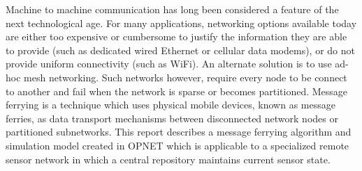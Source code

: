 Machine to machine communication has long been considered a feature of the next technological age. 
For many applications, networking options available today are either too expensive or cumbersome to justify the information they are able to provide (such as dedicated wired Ethernet or cellular data modems), or do not provide uniform connectivity (such as WiFi). 
An alternate solution is to use ad-hoc mesh networking. 
Such networks however, require every node to be connect to another and fail when the network is sparse or becomes partitioned.
Message ferrying is a technique which uses physical mobile devices, known as message ferries, as data transport mechanisms between disconnected network nodes or partitioned subnetworks.
This report describes a message ferrying algorithm and simulation model created in OPNET which is applicable to a specialized remote sensor network in which a central repository maintains current sensor state.

